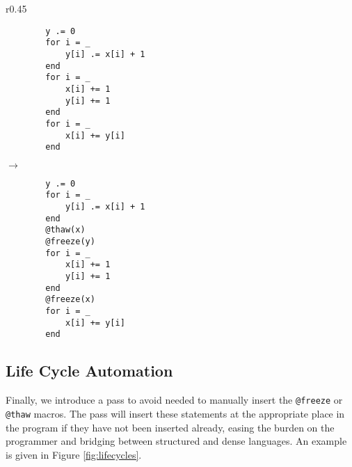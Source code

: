 \begin{wrapfigure}{r}{0.45\textwidth}
    \vspace{-1\intextsep}
    \begin{minipage}{0.2\textwidth}
    \begin{verbatim}
        y .= 0
        for i = _
            y[i] .= x[i] + 1
        end
        for i = _
            x[i] += 1
            y[i] += 1
        end 
        for i = _
            x[i] += y[i]
        end
    \end{verbatim}
    \end{minipage}
    $\rightarrow$
    \begin{minipage}{0.2\textwidth}
    \begin{verbatim}
        y .= 0
        for i = _
            y[i] .= x[i] + 1
        end
        @thaw(x)
        @freeze(y)
        for i = _
            x[i] += 1
            y[i] += 1
        end
        @freeze(x)
        for i = _
            x[i] += y[i]
        end
    \end{verbatim}
    \end{minipage}
    \caption{Life Cycle Automation.}\label{fig:lifecycles}
\end{wrapfigure}
\subsection{Life Cycle Automation}
Finally, we introduce a pass to avoid needed to manually insert the \texttt{@freeze} or \texttt{@thaw} macros. The pass will insert these statements at the appropriate place in the program if they have not been inserted already, easing the burden on the programmer and bridging between structured and dense languages. An example is given in Figure \ref{fig:lifecycles}.